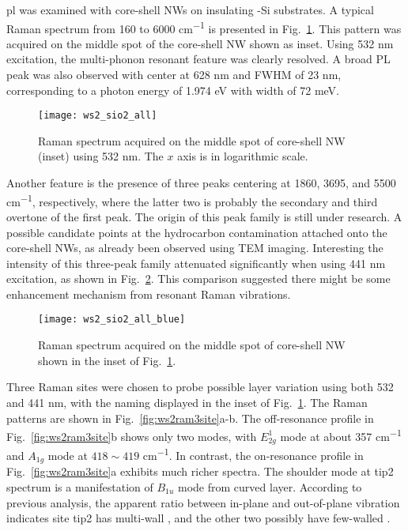 \Gls{pl} was examined with core-shell NWs on insulating -Si substrates. A typical Raman spectrum from 160 to 6000 \si{cm^{-1}} is presented in Fig.~\ref{fig:ws2ramall}. This pattern was acquired on the middle spot of the core-shell NW shown as inset. Using 532 nm excitation, the multi-phonon resonant feature was clearly resolved. A broad PL peak was also observed with center at 628 nm and FWHM of 23 nm, corresponding to a photon energy of 1.974 eV with width of 72 meV.  
\begin{figure}[htb]
\centering
\texttt{[image: ws2\_sio2\_all]}
\caption[Raman spectrum acquired on the middle spot of core-shell NW (inset) using 532 nm. The $x$ axis is in logarithmic scale]{Raman spectrum acquired on the middle spot of core-shell NW (inset) using 532 nm. The $x$ axis is in logarithmic scale.}
\label{fig:ws2ramall}
\end{figure}
Another feature is the presence of three peaks centering at 1860, 3695, and 5500 \si{cm^{-1}}, respectively, where the latter two is probably the secondary and third overtone of the first peak. The origin of this peak family is still under research. A possible candidate points at the hydrocarbon contamination attached onto the core-shell NWs, as already been observed using TEM imaging. Interesting the intensity of this three-peak family attenuated significantly when using 441 nm excitation, as shown in Fig.~\ref{fig:ws2ramblue}. This comparison suggested there might be some enhancement mechanism from  resonant Raman vibrations. 
\begin{figure}[htb]
\centering
\texttt{[image: ws2\_sio2\_all\_blue]}
\caption[Raman spectrum acquired on the middle spot of core-shell NW shown in the inset of Fig.~\ref{fig:ws2ramall}]{Raman spectrum acquired on the middle spot of core-shell NW shown in the inset of Fig.~\ref{fig:ws2ramall}.}
\label{fig:ws2ramblue}
\end{figure}
Three Raman sites were chosen to probe possible layer variation using both 532 and 441 nm, with the naming displayed in the inset of Fig.~\ref{fig:ws2ramall}. The Raman patterns are shown in Fig.~\ref{fig:ws2ram3site}a-b. The off-resonance profile in Fig.~\ref{fig:ws2ram3site}b shows only two modes, with $E_{2g}^1$ mode at about 357 \si{cm^{-1}} and $A_{1g}$ mode at $418\sim419$ \si{cm^{-1}}. In contrast, the on-resonance profile in Fig.~\ref{fig:ws2ram3site}a exhibits much richer spectra. The shoulder mode at tip2 spectrum is a manifestation of $B_{1u}$ mode from curved  layer. According to previous analysis, the apparent ratio between in-plane and out-of-plane vibration indicates site tip2 has multi-wall , and the other two possibly have few-walled . 
